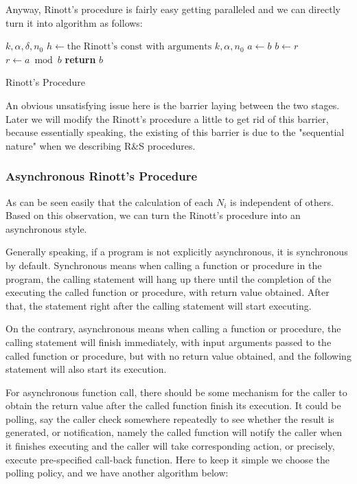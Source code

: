 Anyway, Rinott's procedure is fairly easy getting paralleled and we can directly turn it into algorithm as follows:

\begin{algorithm}
 \begin{algorithmic}[1]
 \Require $k, \alpha, \delta, n_0$
 \State $h \gets \text{the Rinott's const with arguments } k, \alpha, n_0$
 \State 
 \State $a\gets b$
 \State $b\gets r$
 \State $r\gets a\bmod b$
 \EndWhile
 \State \textbf{return} $b$ 
 \end{algorithmic}
 \caption{Rinott's Procedure}
 \label{rinott_alg}
\end{algorithm}

An obvious unsatisfying issue here is the barrier laying between the two stages. Later we will modify the Rinott's procedure a little to get rid of this barrier, because essentially speaking, the existing of this barrier is due to the "sequential nature" when we describing R\&S procedures.

\subsubsection{Asynchronous Rinott's Procedure}

As can be seen easily that the calculation of each $N_i$ is independent of others. Based on this observation, we can turn the Rinott's procedure into an asynchronous style.

Generally speaking, if a program is not explicitly asynchronous, it is synchronous by default. Synchronous means when calling a function or procedure in the program, the calling statement will hang up there until the completion of the executing the called function or procedure, with return value obtained. After that, the statement right after the calling statement will start executing.

On the contrary, asynchronous means when calling a function or procedure, the calling statement will finish immediately, with input arguments passed to the called function or procedure, but with no return value obtained, and the following statement will also start its execution.

For asynchronous function call, there should be some mechanism for the caller to obtain the return value after the called function finish its execution. It could be polling, say the caller check somewhere repeatedly to see whether the result is generated, or notification, namely the called function will notify the caller when it finishes executing and the caller will take corresponding action, or precisely, execute pre-specified call-back function. Here to keep it simple we choose the polling policy, and we have another algorithm below:

